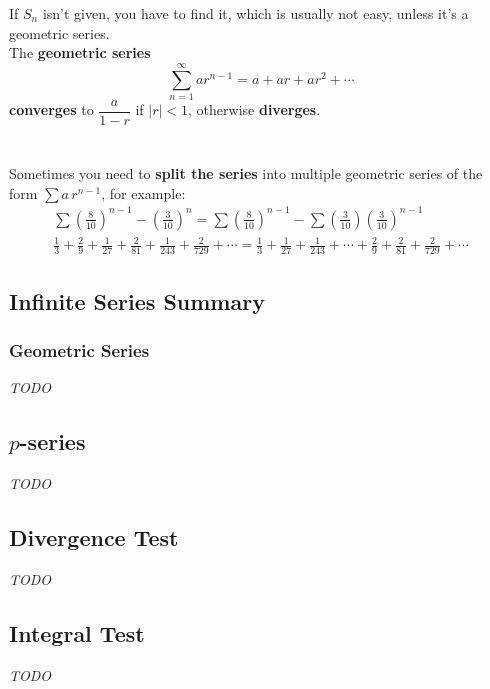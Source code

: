 \documentclass[8pt,letterpaper]{article}
\begin{document}
\noindent If $S_n$ isn't given, you have to find it,
which is usually not easy, unless it's a geometric series. \\


\noindent The \textbf{geometric series}
\begin{equation*}
\sum_{n=1}^\infty ar^{n-1} = a + ar + ar^2 + \cdots
\end{equation*}
\textbf{converges} to $\dfrac{a}{1-r}$ if $|r| < 1$, otherwise \textbf{diverges}.
\\
\\
\noindent {}
\\

\noindent Sometimes you need to \textbf{split the series} into multiple geometric series
of the form $\sum a\,r^{n-1}$, for example:
\begin{align*}
\sum \left(\frac{8}{10}\right)^{n-1} - \left(\frac{3}{10}\right)^n
= \sum \left(\frac{8}{10}\right)^{n-1} - \sum \left(\frac{3}{10}\right) \left(\frac{3}{10}\right)^{n-1}\\
\frac{1}{3} + \frac{2}{9} + \frac{1}{27} + \frac{2}{81} + \frac{1}{243} + \frac{2}{729} + \cdots
= \frac{1}{3} + \frac{1}{27} + \frac{1}{243} + \cdots + \frac{2}{9} + \frac{2}{81} + \frac{2}{729} + \cdots
\end{align*}


\noindent {}

\subsection*{Infinite Series Summary}
\subsubsection*{Geometric Series}
\emph{TODO}
\subsection*{$p$-series}
\emph{TODO}
\subsection*{Divergence Test} %
\emph{TODO}
\subsection*{Integral Test}
\emph{TODO}
\end{document}
